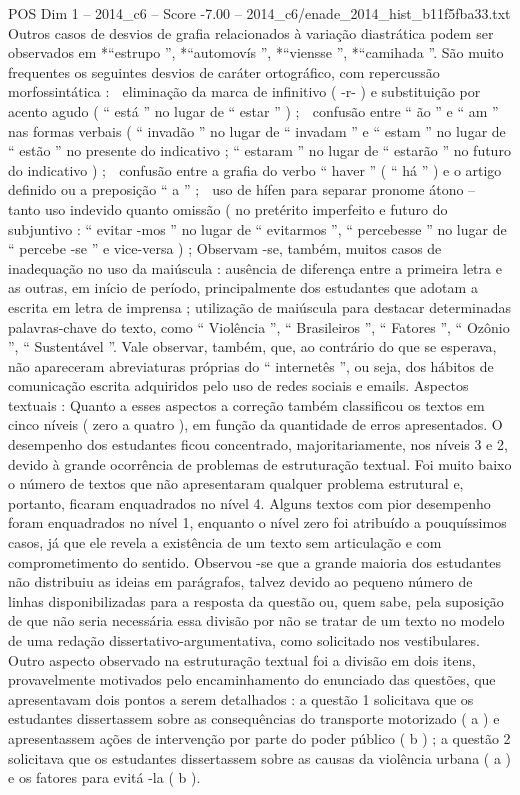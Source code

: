 \begin{textsample}{POS Dim 1 – 2014\_c6 – Score -7.00 – 2014\_c6/enade\_2014\_hist\_b11f5fba33.txt}
Outros casos de desvios de grafia relacionados à variação diastrática podem ser observados em *“estrupo ”, *“automovís ”, *“viensse ”, *“camihada ”.
São muito frequentes os seguintes desvios de caráter ortográfico, com repercussão morfossintática :  eliminação da marca de infinitivo ( -r- ) e substituição por acento agudo ( “ está ” no lugar de “ estar ” ) ;  confusão entre “ ão ” e “ am ” nas formas verbais ( “ invadão ” no lugar de “ invadam ” e “ estam ” no lugar de “ estão ” no presente do indicativo ; “ estaram ” no lugar de “ estarão ” no futuro do indicativo ) ;  confusão entre a grafia do verbo “ haver ” ( “ há ” ) e o artigo definido ou a preposição “ a ” ;  uso de hífen para separar pronome átono – tanto uso indevido quanto omissão ( no pretérito imperfeito e futuro do subjuntivo : “ evitar -mos ” no lugar de “ evitarmos ”, “ percebesse ” no lugar de “ percebe -se ” e vice-versa ) ; Observam -se, também, muitos casos de inadequação no uso da maiúscula : ausência de diferença entre a primeira letra e as outras, em início de período, principalmente dos estudantes que adotam a escrita em letra de imprensa ; utilização de maiúscula para destacar determinadas palavras-chave do texto, como “ Violência ”, “ Brasileiros ”, “ Fatores ”, “ Ozônio ”, “ Sustentável ”.
Vale observar, também, que, ao contrário do que se esperava, não apareceram abreviaturas próprias do “ internetês ”, ou seja, dos hábitos de comunicação escrita adquiridos pelo uso de redes sociais e emails.
Aspectos textuais : Quanto a esses aspectos a correção também classificou os textos em cinco níveis ( zero a quatro ), em função da quantidade de erros apresentados.
O desempenho dos estudantes ficou concentrado, majoritariamente, nos níveis 3 e 2, devido à grande ocorrência de problemas de estruturação textual.
Foi muito baixo o número de textos que não apresentaram qualquer problema estrutural e, portanto, ficaram enquadrados no nível 4.
Alguns textos com pior desempenho foram enquadrados no nível 1, enquanto o nível zero foi atribuído a pouquíssimos casos, já que ele revela a existência de um texto sem articulação e com comprometimento do sentido.
Observou -se que a grande maioria dos estudantes não distribuiu as ideias em parágrafos, talvez devido ao pequeno número de linhas disponibilizadas para a resposta da questão ou, quem sabe, pela suposição de que não seria necessária essa divisão por não se tratar de um texto no modelo de uma redação dissertativo-argumentativa, como solicitado nos vestibulares.
Outro aspecto observado na estruturação textual foi a divisão em dois itens, provavelmente motivados pelo encaminhamento do enunciado das questões, que apresentavam dois pontos a serem detalhados : a questão 1 solicitava que os estudantes dissertassem sobre as consequências do transporte motorizado ( a ) e apresentassem ações de intervenção por parte do poder público ( b ) ; a questão 2 solicitava que os estudantes dissertassem sobre as causas da violência urbana ( a ) e os fatores para evitá -la ( b ).

\end{textsample}
